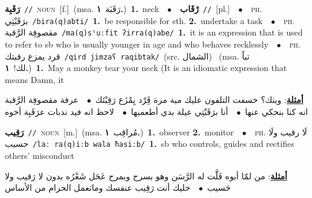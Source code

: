 \documentclass[10pt,a4paper,twoside]{article} %
\begin{document}
\begin{multicols}{2}
{\setlength\topsep{0pt}\textbf{\foreignlanguage{arabic}{رَقَبِة}}\ {\color{gray}\texttt{//}\color{black}}\ \textsc{noun}\ [f.]\ \color{gray}(msa. \foreignlanguage{arabic}{رَقَبَة}~\foreignlanguage{arabic}{\textbf{١.}})\color{black}\ \textbf{1.}~neck\ \ $\bullet$\ \ \setlength\topsep{0pt}\textbf{\foreignlanguage{arabic}{رْقَاب}}\ {\color{gray}\texttt{//}\color{black}}\ [pl.]\ \ $\bullet$\ \ \textsc{ph.} \color{gray} \foreignlanguage{arabic}{برَقَبْتِي}\color{black}\ {\color{gray}\texttt{/{\sffamily bira(q)abti}/}\color{black}}\ \textbf{1.}~be responsible for sth.  \textbf{2.}~undertake a task\ \ $\bullet$\ \ \textsc{ph.} \color{gray} \foreignlanguage{arabic}{مقصوفِة الرَّقبة}\color{black}\ {\color{gray}\texttt{/{\sffamily ma(q)sˤuːfit ʔirra(q)abe}/}\color{black}}\ \textbf{1.}~it is an expression that is used to refer to sb who is usually younger in age and who behaves recklessly\ \ $\bullet$\ \ \textsc{ph.} \color{gray} \foreignlanguage{arabic}{قرد يمزع رقبتك}\color{black}\ {\color{gray}\texttt{/{\sffamily qird jimzaʕ raqibtak}/}\color{black}}\ \color{gray}(src. \foreignlanguage{arabic}{الشمال})\color{black}\ \color{gray} (msa. \foreignlanguage{arabic}{تباً لك!}~\foreignlanguage{arabic}{\textbf{١.}})\color{black}\ \textbf{1.}~May a monkey tear your neck (It is an idiomatic expression that means Damn, it\  \begin{flushright}\color{gray}\foreignlanguage{arabic}{\textbf{\underline{\foreignlanguage{arabic}{أمثلة}}}: وينك؟ خسفت التلفون عليك مية مرة قَِرْد يِمْزَع رَقِبْتَك\ $\bullet$\ \  عرفة مقصوفِة الرَّقبة انه كنا بنحكي عنها\ $\bullet$\ \  أنا برَقَبْتِي عيلة بدي أطعميها\ $\bullet$\ \  لاحظ انه فيد ندبات عرَقَبِة أخوه}\end{flushright}\color{black}} \vspace{2mm}

{\setlength\topsep{0pt}\textbf{\foreignlanguage{arabic}{رَقِيب}}\ {\color{gray}\texttt{//}\color{black}}\ \textsc{noun}\ [m.]\ \color{gray}(msa. \foreignlanguage{arabic}{مُراقِب}~\foreignlanguage{arabic}{\textbf{١.}})\color{black}\ \textbf{1.}~observer  \textbf{2.}~monitor\ \ $\bullet$\ \ \textsc{ph.} \color{gray} \foreignlanguage{arabic}{لَا رقيب ولَا حسيب}\color{black}\ {\color{gray}\texttt{/{\sffamily laː ra(q)iːb wala ħasiːb}/}\color{black}}\ \textbf{1.}~sb who controls, guides and rectifies others' misconduct\  \begin{flushright}\color{gray}\foreignlanguage{arabic}{\textbf{\underline{\foreignlanguage{arabic}{أمثلة}}}: من لمّا أبوه فَلََّت له الرَّسَن وهو بسرح وبمرح عَحَل شَعْرُه بدون لا رَقيب ولا حَسيب\ $\bullet$\ \  خليك أنت رَقِيب عنفسك وماتعمل الحرام من الأساس}\end{flushright}\color{black}} \vspace{2mm}


\end{multicols}
\end{document}
